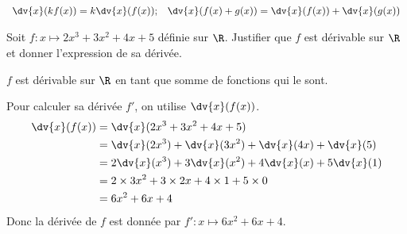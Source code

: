 \documentclass{article}
\begin{document}
\begin{tcolorbox}
\begin{remark}
\begin{equation*}
\begin{array}{cc}
\dv{x}(kf(x)) = k\dv{x}(f(x)); & \dv{x}(f(x)+g(x)) = \dv{x}(f(x)) + \dv{x}(g(x))
\end{array}
\end{equation*}
\end{remark}
\end{tcolorbox}
\begin{example}
Soit $f \colon x \mapsto 2x^3 + 3x^2 + 4x + 5$ définie sur $\R$. Justifier que $f$ est dérivable sur $\R$ et donner l'expression de sa dérivée.
\begin{tcolorbox}
$f$ est dérivable sur $\R$ en tant que somme de fonctions qui le sont.

Pour calculer sa dérivée $f'$, on utilise $\dv{x}(f(x))$.
\begin{equation*}
\begin{aligned}
\dv{x}(f(x)) &= \dv{x}(2x^3 + 3x^2 + 4x + 5)\\
&= \dv{x}(2x^3) + \dv{x}(3x^2) + \dv{x}(4x) + \dv{x}(5)\\
&= 2\dv{x}(x^3) + 3\dv{x}(x^2) + 4\dv{x}(x) + 5\dv{x}(1)\\
&= 2 \times 3x^2 + 3 \times 2x + 4 \times 1 + 5 \times 0\\
&= 6x^2 + 6x + 4
\end{aligned}
\end{equation*}
Donc la dérivée de $f$ est donnée par $f' \colon x \mapsto 6x^2 + 6x + 4$.
\end{tcolorbox}
\end{example}
\end{document}
